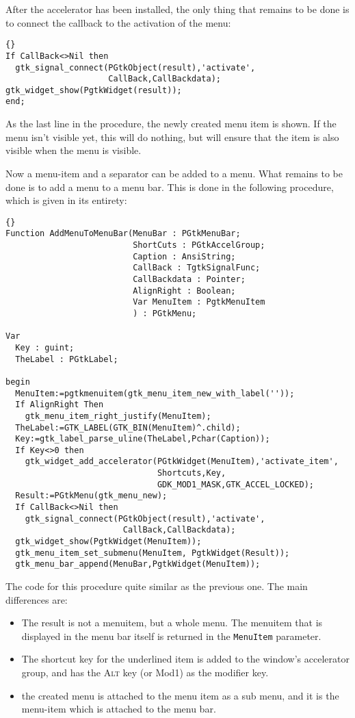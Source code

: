 \documentclass[10pt]{article}
\begin{document}
After the accelerator has been installed, the only thing that remains to be
done is to connect the callback to the activation of the menu:
\begin{lstlisting}{}
If CallBack<>Nil then
  gtk_signal_connect(PGtkObject(result),'activate',
                     CallBack,CallBackdata);
gtk_widget_show(PgtkWidget(result));  
end;
\end{lstlisting}
As the last line in the procedure, the newly created menu item is shown.
If the menu isn't visible yet, this will do nothing, but will ensure that
the item is also visible when the menu is visible.

Now a menu-item and a separator can be added to a menu. What remains to be
done is to add a menu to a menu bar. This is done in the following
procedure, which is given in its entirety:
\begin{lstlisting}{}
Function AddMenuToMenuBar(MenuBar : PGtkMenuBar;
                          ShortCuts : PGtkAccelGroup;
                          Caption : AnsiString;
                          CallBack : TgtkSignalFunc;
                          CallBackdata : Pointer;   
                          AlignRight : Boolean;     
                          Var MenuItem : PgtkMenuItem
                          ) : PGtkMenu; 

Var
  Key : guint;
  TheLabel : PGtkLabel;

begin
  MenuItem:=pgtkmenuitem(gtk_menu_item_new_with_label(''));
  If AlignRight Then
    gtk_menu_item_right_justify(MenuItem);
  TheLabel:=GTK_LABEL(GTK_BIN(MenuItem)^.child);
  Key:=gtk_label_parse_uline(TheLabel,Pchar(Caption));
  If Key<>0 then
    gtk_widget_add_accelerator(PGtkWidget(MenuItem),'activate_item',
                               Shortcuts,Key,
                               GDK_MOD1_MASK,GTK_ACCEL_LOCKED);
  Result:=PGtkMenu(gtk_menu_new);
  If CallBack<>Nil then
    gtk_signal_connect(PGtkObject(result),'activate',
                        CallBack,CallBackdata);
  gtk_widget_show(PgtkWidget(MenuItem));  
  gtk_menu_item_set_submenu(MenuItem, PgtkWidget(Result));
  gtk_menu_bar_append(MenuBar,PgtkWidget(MenuItem));
\end{lstlisting}
The code for this procedure quite similar as the previous one. The main
differences are:
\begin{itemize}
\item The result is not a menuitem, but a whole menu. The menuitem that is
displayed in the menu bar itself is returned in the \lstinline|MenuItem|
parameter.
\item The shortcut key for the underlined item is added to the window's
accelerator group, and has the \textsc{Alt} key (or \textsf{Mod1}) as 
the modifier key.
\item the created menu is attached to the menu item as a sub menu, and it is
the menu-item which is attached to the menu bar.
\end{itemize}
\end{document}
